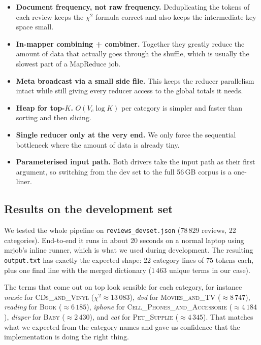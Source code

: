 \documentclass[11pt,a4paper]{article}
\begin{document}
\begin{itemize}
    \item \textbf{Document frequency, not raw frequency.} Deduplicating
          the tokens of each review keeps the $\chi^2$ formula correct
          and also keeps the intermediate key space small.
    \item \textbf{In-mapper combining + combiner.} Together they greatly
          reduce the amount of data that actually goes through the
          shuffle, which is usually the slowest part of a MapReduce job.
    \item \textbf{Meta broadcast via a small side file.} This keeps the
          reducer parallelism intact while still giving every reducer
          access to the global totals it needs.
    \item \textbf{Heap for top-$K$.} $O(V_c \log K)$ per category is
          simpler and faster than sorting and then slicing.
    \item \textbf{Single reducer only at the very end.} We only force
          the sequential bottleneck where the amount of data is
          already tiny.
    \item \textbf{Parameterised input path.} Both drivers take the
          input path as their first argument, so switching from the
          dev set to the full 56\,GB corpus is a one-liner.
\end{itemize}

\subsection{Results on the development set}

We tested the whole pipeline on \texttt{reviews\_devset.json}
(78\,829 reviews, 22 categories). End-to-end it runs in about 20
seconds on a normal laptop using mrjob's inline runner, which is
what we used during development. The resulting \texttt{output.txt}
has exactly the expected shape: 22 category lines of 75 tokens each,
plus one final line with the merged dictionary (1\,463 unique terms
in our case).

The terms that come out on top look sensible for each category, for
instance \textit{music} for \textsc{CDs\_and\_Vinyl}
($\chi^2\!\approx\!13\,083$), \textit{dvd} for
\textsc{Movies\_and\_TV} (${\approx}8\,747$), \textit{reading} for
\textsc{Book} (${\approx}6\,185$), \textit{iphone} for
\textsc{Cell\_Phones\_and\_Accessorie} (${\approx}4\,184$),
\textit{diaper} for \textsc{Baby} (${\approx}2\,430$), and
\textit{cat} for \textsc{Pet\_Supplie} (${\approx}4\,345$). That
matches what we expected from the category names and gave us
confidence that the implementation is doing the right thing.
\end{document}
